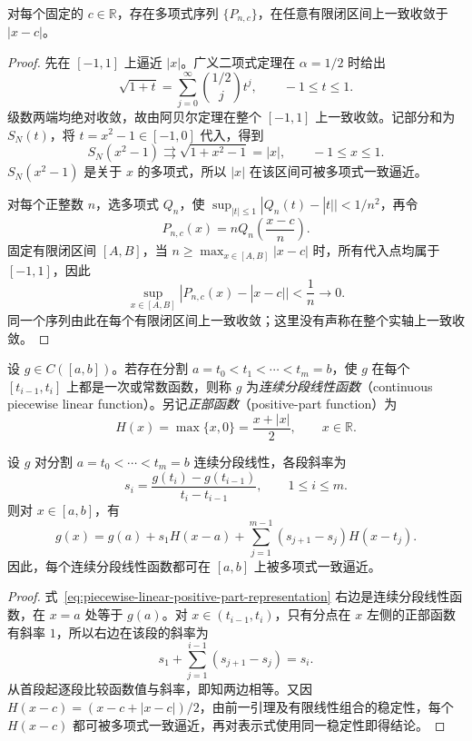 \documentclass[UTF8,12pt,a4paper,fontset=fandol]{ctexbook}
\begin{document}
\begin{lemma}[绝对值函数的多项式逼近]
\label{lem:absolute-value-polynomial-approximation}
对每个固定的 $c\in\mathbb R$，存在多项式序列 $\{P_{n,c}\}$，在任意有限闭区间上一致收敛于 $|x-c|$。
\end{lemma}

\begin{proof}
先在 $[-1,1]$ 上逼近 $|x|$。广义二项式定理在 $\alpha=1/2$ 时给出
\[
    \sqrt{1+t}=\sum_{j=0}^\infty\binom{1/2}j t^j,
    \qquad -1\leq t\leq1.
\]
级数两端均绝对收敛，故由阿贝尔定理在整个 $[-1,1]$ 上一致收敛。记部分和为 $S_N(t)$，将 $t=x^2-1\in[-1,0]$ 代入，得到
\[
    S_N(x^2-1)\rightrightarrows\sqrt{1+x^2-1}=|x|,
    \qquad -1\leq x\leq1.
\]
$S_N(x^2-1)$ 是关于 $x$ 的多项式，所以 $|x|$ 在该区间可被多项式一致逼近。

对每个正整数 $n$，选多项式 $Q_n$，使 $\sup_{|t|\leq1}|Q_n(t)-|t||<1/n^2$，再令
\[
    P_{n,c}(x)=nQ_n\left(\frac{x-c}{n}\right).
\]
固定有限闭区间 $[A,B]$，当 $n\geq\max_{x\in[A,B]}|x-c|$ 时，所有代入点均属于 $[-1,1]$，因此
\[
    \sup_{x\in[A,B]}|P_{n,c}(x)-|x-c||<\frac1n\longrightarrow0.
\]
同一个序列由此在每个有限闭区间上一致收敛；这里没有声称在整个实轴上一致收敛。
\end{proof}

\begin{definition}
\label{def:continuous-piecewise-linear-function}
设 $g\in C([a,b])$。若存在分割 $a=t_0<t_1<\cdots<t_m=b$，使 $g$ 在每个 $[t_{i-1},t_i]$ 上都是一次或常数函数，则称 $g$ 为\emph{连续分段线性函数}（continuous piecewise linear function）。另记\emph{正部函数}（positive-part function）为
\[
    H(x)=\max\{x,0\}=\frac{x+|x|}{2},\qquad x\in\mathbb R.
\]
\end{definition}

\begin{lemma}[分段线性函数的表示与逼近]
\label{lem:piecewise-linear-hinge-representation}
设 $g$ 对分割 $a=t_0<\cdots<t_m=b$ 连续分段线性，各段斜率为
\[
    s_i=\frac{g(t_i)-g(t_{i-1})}{t_i-t_{i-1}},\qquad 1\leq i\leq m.
\]
则对 $x\in[a,b]$，有
\begin{equation}
    g(x)=g(a)+s_1H(x-a)
       +\sum_{j=1}^{m-1}(s_{j+1}-s_j)H(x-t_j).
    \label{eq:piecewise-linear-positive-part-representation}
\end{equation}
因此，每个连续分段线性函数都可在 $[a,b]$ 上被多项式一致逼近。
\end{lemma}

\begin{proof}
式~\eqref{eq:piecewise-linear-positive-part-representation} 右边是连续分段线性函数，在 $x=a$ 处等于 $g(a)$。对 $x\in(t_{i-1},t_i)$，只有分点在 $x$ 左侧的正部函数有斜率 $1$，所以右边在该段的斜率为
\[
    s_1+\sum_{j=1}^{i-1}(s_{j+1}-s_j)=s_i.
\]
从首段起逐段比较函数值与斜率，即知两边相等。又因 $H(x-c)=(x-c+|x-c|)/2$，由前一引理及有限线性组合的稳定性，每个 $H(x-c)$ 都可被多项式一致逼近，再对表示式使用同一稳定性即得结论。
\end{proof}
\end{document}
